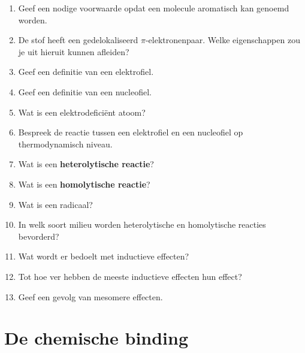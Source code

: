 \documentclass[a4paper,12pt]{article}
\begin{document}
\begin{enumerate}
        \item Geef een nodige voorwaarde opdat een molecule aromatisch kan genoemd worden.
        \item De stof  heeft een gedelokaliseerd $\pi$-elektronenpaar. Welke eigenschappen zou je uit hieruit kunnen afleiden? 
        \item Geef een definitie van een elektrofiel.
        \item Geef een definitie van een nucleofiel.
        \item Wat is een elektrodefici\"ent atoom?
        \item Bespreek de reactie tussen een elektrofiel en een nucleofiel op thermodynamisch niveau.
        \item Wat is een \textbf{heterolytische reactie}?
        \item Wat is een \textbf{homolytische reactie}?
        \item Wat is een radicaal?
        \item In welk soort milieu worden heterolytische en homolytische reacties bevorderd?
        \item Wat wordt er bedoelt met inductieve effecten?
        \item Tot hoe ver hebben de meeste inductieve effecten hun effect?
        \item Geef een gevolg van mesomere effecten.
    \end{enumerate}
    
    \section{De chemische binding}
\end{document}
